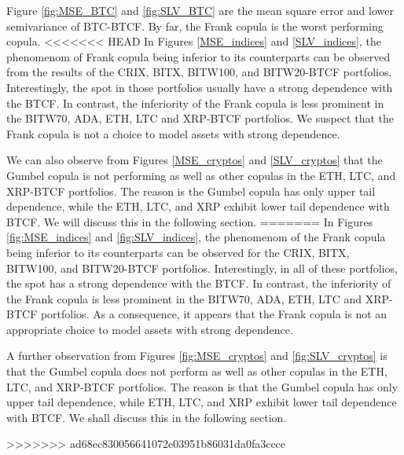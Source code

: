 
Figure \ref{fig:MSE_BTC} and \ref{fig:SLV_BTC} are the mean square
error and lower semivariance of BTC-BTCF. By far, the Frank copula
is the worst performing copula.
<<<<<<< HEAD
In Figures \ref{MSE_indices} and \ref{SLV_indices}, the phenomenom
of Frank copula being inferior to its counterparts can be observed
from the results of the CRIX, BITX, BITW100, and BITW20-BTCF
portfolios.
Interestingly, the spot in those portfolios usually have a strong
dependence with the BTCF.
In contrast, the inferiority of the Frank copula is less prominent in
the BITW70, ADA, ETH, LTC and XRP-BTCF portfolios.
We suspect that the Frank copula is not a choice to model assets with
strong dependence.

We can also observe from Figures \ref{MSE_cryptos} and
\ref{SLV_cryptos} that the Gumbel copula is not performing as well as
other copulas in the ETH, LTC, and XRP-BTCF portfolios.
The reason is the Gumbel copula has only upper tail dependence,
while the ETH, LTC, and XRP exhibit lower tail dependence with BTCF.
We will discuss this in the following section.
=======
In Figures \ref{fig:MSE_indices} and \ref{fig:SLV_indices}, the
phenomenom of the Frank copula being inferior to its counterparts can
be observed for the CRIX, BITX, BITW100, and
BITW20-BTCF portfolios.
Interestingly, in all of these portfolios, the spot has a
strong dependence with the BTCF.
In contrast, the inferiority of the Frank copula is less prominent in
the BITW70, ADA, ETH, LTC and XRP-BTCF portfolios.
As a consequence, it appears that the Frank copula is not an
appropriate choice to model assets with strong dependence.

A further observation from Figures \ref{fig:MSE_cryptos} and
\ref{fig:SLV_cryptos} is that the Gumbel copula does not perform as
well as other copulas in the ETH, LTC, and XRP-BTCF portfolios.
The reason is that the Gumbel copula has only upper tail dependence,
while ETH, LTC, and XRP exhibit lower tail dependence with BTCF.
We shall discuss this in the following section.

>>>>>>> ad68ec830056641072e03951b86031da0fa3ccce

